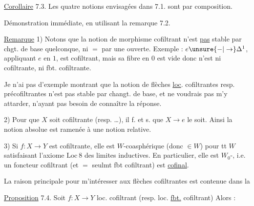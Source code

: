 \uline{Corollaire} 7.3. Les quatre notions envisagées
dans 7.1. sont  par composition.

Démonstration immédiate, en
utilisant la remarque 7.2.

\uline{Remarque}  1) Notons que
la notion de morphisme cofiltrant
 n'est \uline{pas} stable par
chgt. de base quelconque, ni $=$ par une
 ouverte. Exemple : $e\unsure{-|\to}\Delta^1$, appliquant
$e$ en $1$, est cofiltrant, mais sa
fibre en $0$ est vide donc n'est
ni cofiltrante, ni fbt. cofiltrante.

Je n'ai pas  d'exemple montrant que la
notion de flèches \uline{loc}. cofiltrantes resp. précofiltrantes
n'est pas stable par changt. de base, et ne voudrais pas m'y attarder, n'ayant pas besoin de
connaître la réponse.

2) Pour que $X$ soit cofiltrante (resp. \ldots),
il f. et s. que $X\longrightarrow e$ le soit. Ainsi la
notion absolue est ramenée à une notion
relative.

3) Si $f:X\to Y$ est cofiltrante, elle est
$W$-coasphérique (donc $\in W$) pour tt  $W$
satisfaisant l'axiome $\mathrm{Loc}\ 8$ des limites
inductives. En particulier, elle est $W_0$-,
i.e. un foncteur cofiltrant  (et $=$
seulmt fbt cofiltrant) est  \uline{cofinal}.

La raison principale pour m'intéresser
aux flèches cofiltrantes est contenue
dans la

\uline{Proposition} 7.4. Soit $f:X\longrightarrow Y$  loc. cofiltrant
(resp. loc. \uline{fbt.} cofiltrant)
Alors : 

